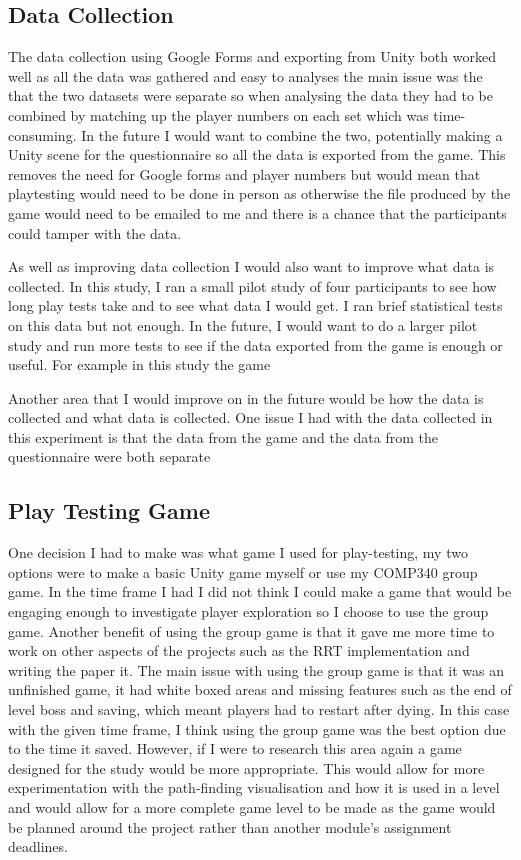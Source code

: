 \documentclass[journal]{IEEEtran}
\begin{document}
	\subsection{Data Collection}
	The data collection using Google Forms and exporting from Unity both worked well as all the data was gathered and easy to analyses the main issue was the that the two datasets were separate so when analysing the data they had to be combined by matching up the player numbers on each set which was time-consuming. In the future I would want to combine the two, potentially making a Unity scene for the questionnaire so all the data is exported from the game. This removes the need for Google forms and player numbers but would mean that playtesting would need to be done in person as otherwise the file produced by the game would need to be emailed to me and there is a chance that the participants could tamper with the data.
	
	As well as improving data collection I would also want to improve what data is collected. In this study, I ran a small pilot study of four participants to see how long play tests take and to see what data I would get. I ran brief statistical tests on this data but not enough. In the future, I would want to do a larger pilot study and run more tests to see if the data exported from the game is enough or useful. For example in this study the game 
	
	Another area that I would improve on in the future would be how the data is collected and what data is collected. One issue I had with the data collected in this experiment is that the data from the game and the data from the questionnaire were both separate 
	
	\subsection{Play Testing Game}
	One decision I had to make was what game I used for play-testing, my two options were to make a basic Unity game myself or use my COMP340 group game. In the time frame I had I did not think I could make a game that would be engaging enough to investigate player exploration so I choose to use the group game. 
	Another benefit of using the group game is that it gave me more time to work on other aspects of the projects such as the RRT implementation and writing the paper it. The main issue with using the group game is that it was an unfinished game, it had white boxed areas and missing features such as the end of level boss and saving, which meant players had to restart after dying.
	In this case with the given time frame, I think using the group game was the best option due to the time it saved. However, if I were to research this area again a game designed for the study would be more appropriate. This would allow for more experimentation with the path-finding visualisation and how it is used in a level and would allow for a more complete game level to be made as the game would be planned around the project rather than another module's assignment deadlines.
	
\end{document}
